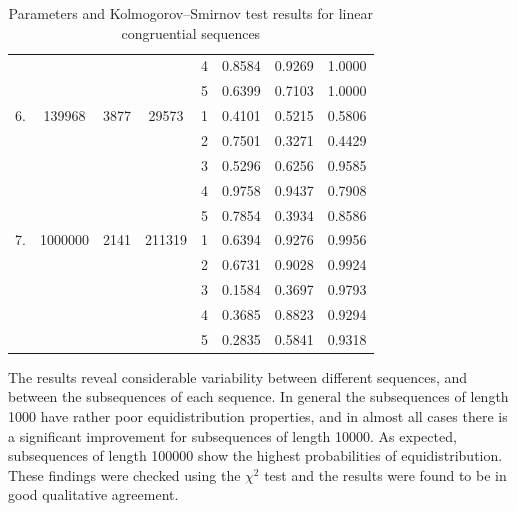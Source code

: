 \documentclass[dvips]{article}
\begin{document}
\begin{table}[htbp]
\begin{tabular}{|c||c|c|c||c|c|c|c|}
   &        &      &         & 4 & 0.8584 & 0.9269 & 1.0000 \\
   &        &      &         & 5 & 0.6399 & 0.7103 & 1.0000 \\ \hline
6. & 139968 & 3877 & 29573   & 1 & 0.4101 & 0.5215 & 0.5806 \\
   &        &      &         & 2 & 0.7501 & 0.3271 & 0.4429 \\ 
   &        &      &         & 3 & 0.5296 & 0.6256 & 0.9585 \\
   &        &      &         & 4 & 0.9758 & 0.9437 & 0.7908 \\
   &        &      &         & 5 & 0.7854 & 0.3934 & 0.8586 \\ \hline
7. & 1000000 & 2141 & 211319 & 1 & 0.6394 & 0.9276 & 0.9956 \\
   &        &      &         & 2 & 0.6731 & 0.9028 & 0.9924 \\ 
   &        &      &         & 3 & 0.1584 & 0.3697 & 0.9793 \\
   &        &      &         & 4 & 0.3685 & 0.8823 & 0.9294 \\
   &        &      &         & 5 & 0.2835 & 0.5841 & 0.9318 \\ \hline
\end{tabular}
\caption{Parameters and Kolmogorov--Smirnov test results for linear
congruential sequences}
\label{tabKS}
\end{table}

The results reveal considerable variability between different sequences,
and between the subsequences of each sequence.  In general the
subsequences of length 1000 have rather poor equidistribution
properties, and in almost all cases there is a significant improvement for
subsequences of
length 10000.  As expected, subsequences of length 100000 show the
highest probabilities of equidistribution.  These findings were
checked using the $\chi^{2}$ test and the results were found to be in
good qualitative agreement. 
\end{document}
